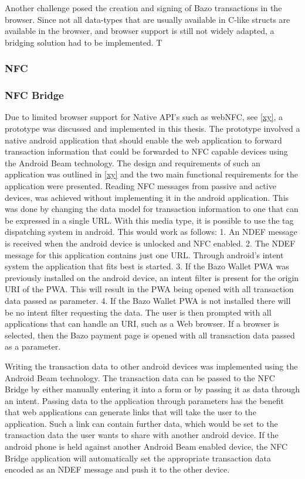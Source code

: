 \documentclass[a4paper]{article}
\begin{document}
Another challenge posed the creation and signing of Bazo transactions in the browser. Since not all data-types that are usually available in C-like structs are available in the browser, and browser support is still not widely adapted, a bridging solution had to be implemented.
T


\subsubsection{NFC}
\subsubsection{NFC Bridge}
Due to limited browser support for Native API's such as webNFC, see \ref{xy}, a prototype was discussed and implemented in this thesis. The prototype involved a native android application that should enable the web application to forward transaction information that could be forwarded to NFC capable devices using the Android Beam technology.
The design and requirements of such an application was outlined in \ref{xy} and the two main functional requirements for the application were presented.
Reading NFC messages from passive and active devices, was achieved without implementing it in the android application. This was done by changing the data model for transaction information to one that can be expressed in a single URL. With this media type, it is possible to use the tag dispatching system in android. This would work as follows:
1. An NDEF message is received when the android device is unlocked and NFC enabled.
2. The NDEF message for this application contains just one URL. Through android's intent system the application that fits best is started.
3. If the Bazo Wallet PWA was previously installed on the android device, an intent filter is present for the origin URI of the PWA. This will result in the PWA being opened with all transaction data passed as parameter.
4. If the Bazo Wallet PWA is not installed there will be no intent filter requesting the data. The user is then prompted with all applications that can handle an URI, such as a Web browser. If a browser is selected, then the Bazo payment page is opened with all transaction data passed as a parameter.

Writing the transaction data to other android devices was implemented using the Android Beam technology.
The transaction data can be passed to the NFC Bridge by either manually entering it into a form or by passing it as data through an intent. Passing data to the application through parameters has the benefit that web applications can generate links that will take the user to the application. Such a link can contain further data, which would be set to the transaction data the user wants to share with another android device.
If the android phone is held against another Android Beam enabled device, the NFC Bridge application will automatically set the appropriate transaction data encoded as an NDEF message and push it to the other device.
\end{document}
